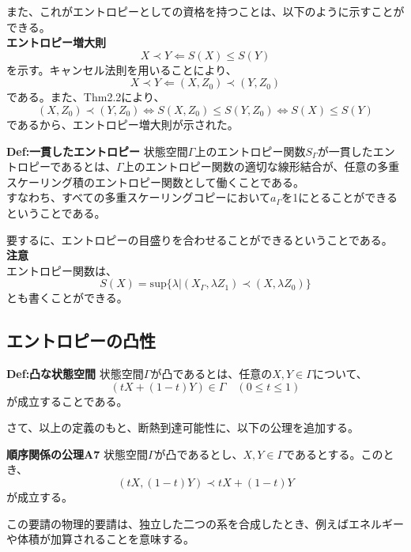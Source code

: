 \documentclass[a4paper,11pt]{jsarticle}
\numberwithin{equation}{section}
\begin{document}
また、これがエントロピーとしての資格を持つことは、以下のように示すことができる。\\
\textbf{エントロピー増大則}\\
\begin{equation}
    X \prec Y \Leftarrow S(X) \leq S(Y)
\end{equation}
を示す。キャンセル法則を用いることにより、
\begin{equation}
    X \prec Y \Leftarrow (X,Z_0) \prec (Y,Z_0)
\end{equation}
である。また、Thm2.2により、
\begin{equation}
    (X,Z_0) \prec (Y,Z_0) \Leftrightarrow S(X,Z_0) \leq S(Y,Z_0) \Leftrightarrow S(X) \leq S(Y)
\end{equation}
であるから、エントロピー増大則が示された。\hfill\qedsymbol\\

\begin{itembox}[l]{\textbf{Def:一貫したエントロピー}}
    状態空間$\Gamma$上のエントロピー関数$S_{\Gamma}$が一貫したエントロピーであるとは、$\Gamma$上のエントロピー関数の適切な線形結合が、任意の多重スケーリング積のエントロピー関数として働くことである。\\
    すなわち、すべての多重スケーリングコピーにおいて$a_{\Gamma}$を1にとることができるということである。
\end{itembox}
要するに、エントロピーの目盛りを合わせることができるということである。\\

\textbf{注意}\\
エントロピー関数は、
\begin{equation}
    S(X) =\text{sup}\{\lambda|(X_{\Gamma},\lambda Z_1)\prec (X,\lambda Z_0)\}
\end{equation}
とも書くことができる。\\

\subsection{エントロピーの凸性}
\begin{itembox}[l]{\textbf{Def:凸な状態空間}}
    状態空間$\Gamma$が凸であるとは、任意の$X,Y \in \Gamma$について、
    \begin{equation}
        (tX+(1-t)Y) \in \Gamma \quad (0 \leq t \leq 1)
    \end{equation}
    が成立することである。
\end{itembox}

さて、以上の定義のもと、断熱到達可能性に、以下の公理を追加する。\\
\begin{itembox}[l]{\textbf{順序関係の公理A7}}
    状態空間$\Gamma$が凸であるとし、$X,Y \in \Gamma$であるとする。このとき、
    \begin{equation}
        (tX,(1-t)Y) \prec tX+(1-t)Y
    \end{equation}
    が成立する。
\end{itembox}
この要請の物理的要請は、独立した二つの系を合成したとき、例えばエネルギーや体積が加算されることを意味する。
\end{document}
